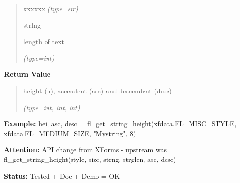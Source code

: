 \begin{boxedminipage}{\funcwidth}
\begin{quote}
\begin{Ventry}{xxxxxx}
            {\it (type=str)}

          \item[strlng]

          length of text

            {\it (type=int)}

        \end{Ventry}

      \end{quote}

      \textbf{Return Value}
    \vspace{-1ex}

      \begin{quote}
      height (h), ascendent (asc) and descendent (desc)

      {\it (type=int, int, int)}

      \end{quote}

\textbf{Example:} hei, asc, desc = fl\_get\_string\_height(xfdata.FL\_MISC\_STYLE, 
xfdata.FL\_MEDIUM\_SIZE, "Mystring", 8)



\textbf{Attention:} API change from XForms - upstream was fl\_get\_string\_height(style, size, 
strng, strglen, asc, desc)



\textbf{Status:} Tested + Doc + Demo = OK



    \end{boxedminipage}

    \label{xformslib:flbasic:fl_get_string_width}

    \vspace{0.5ex}


